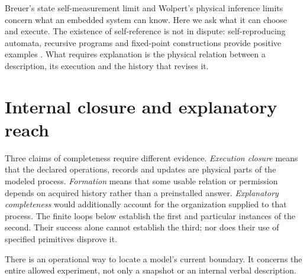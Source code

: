 \documentclass[12pt,a4paper]{article}
\begin{document}
Breuer's state self-measurement limit \cite{Breuer1995} and Wolpert's physical inference limits \cite{Wolpert2008} concern what an embedded system can know. Here we ask what it can choose and execute. The existence of self-reference is not in dispute: self-reproducing automata, recursive programs and fixed-point constructions provide positive examples \cite{vonNeumann1966,Kleene1952,Lawvere1969}. What requires explanation is the physical relation between a description, its execution and the history that revises it.

\section{Internal closure and explanatory reach}
\label{sec:explanation}

Three claims of completeness require different evidence.
\emph{Execution closure} means that the declared operations, records and
updates are physical parts of the modeled process.
\emph{Formation} means that some usable relation or permission depends
on acquired history rather than a preinstalled answer.
\emph{Explanatory completeness} would additionally account for the
organization supplied to that process. The finite loops below establish
the first and particular instances of the second. Their success alone
cannot establish the third; nor does their use of specified primitives
disprove it.

There is an operational way to locate a model's current boundary.
It concerns the entire allowed experiment, not only a snapshot or an
internal verbal description.
\end{document}
